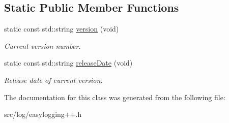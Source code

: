 \subsection*{Static Public Member Functions}
\begin{DoxyCompactItemize}
\item 
static const std\+::string \hyperlink{classel_1_1VersionInfo_a6fee512d52168445b2118ff2b31b4058}{version} (void)\hypertarget{classel_1_1VersionInfo_a6fee512d52168445b2118ff2b31b4058}{}\label{classel_1_1VersionInfo_a6fee512d52168445b2118ff2b31b4058}

\begin{DoxyCompactList}\small\item\em Current version number. \end{DoxyCompactList}\item 
static const std\+::string \hyperlink{classel_1_1VersionInfo_ab23c2545115898f4071fa4e125204946}{release\+Date} (void)\hypertarget{classel_1_1VersionInfo_ab23c2545115898f4071fa4e125204946}{}\label{classel_1_1VersionInfo_ab23c2545115898f4071fa4e125204946}

\begin{DoxyCompactList}\small\item\em Release date of current version. \end{DoxyCompactList}\end{DoxyCompactItemize}


The documentation for this class was generated from the following file\+:\begin{DoxyCompactItemize}
\item 
src/log/easylogging++.\+h\end{DoxyCompactItemize}
